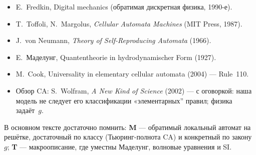 \begin{itemize}
\item E.~Fredkin, Digital mechanics (обратимая дискретная физика, 1990-е).
\item T.~Toffoli, N.~Margolus, \emph{Cellular Automata Machines} (MIT Press, 1987).
\item J.~von Neumann, \emph{Theory of Self-Reproducing Automata} (1966).
\item E.~Маделунг, Quantentheorie in hydrodynamischer Form (1927).
\item M.~Cook, Universality in elementary cellular automata (2004) --- Rule~110.
\item Обзор CA: S.~Wolfram, \emph{A New Kind of Science} (2002) --- с оговоркой:
  наша модель не следует его классификации «элементарных'' правил; физика задаёт~$g$.
\end{itemize}

\medskip
\noindent
В основном тексте достаточно помнить: \textbf{M} --- обратимый локальный автомат на решётке,
достаточный по классу (Тьюринг-полнота CA) и конкретный по закону~$g$;
\textbf{T} --- макроописание, где уместны Маделунг, волновые уравнения и SI.
